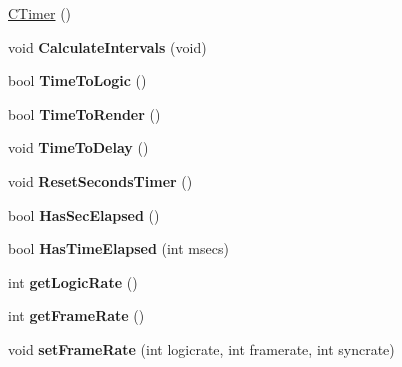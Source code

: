 \begin{DoxyCompactItemize}
\item 
\hyperlink{class_c_timer_a93e4d770fd09f5e1b984768620cc52bf}{CTimer} ()
\item 
\hypertarget{class_c_timer_a060d0fe9aa76f1fbbe64dac348fdf23c}{
void {\bfseries CalculateIntervals} (void)}
\label{class_c_timer_a060d0fe9aa76f1fbbe64dac348fdf23c}

\item 
\hypertarget{class_c_timer_a07cc434c081d25e3338edade3456d5ca}{
bool {\bfseries TimeToLogic} ()}
\label{class_c_timer_a07cc434c081d25e3338edade3456d5ca}

\item 
\hypertarget{class_c_timer_acaf28358697c42d276eb668cc17bafff}{
bool {\bfseries TimeToRender} ()}
\label{class_c_timer_acaf28358697c42d276eb668cc17bafff}

\item 
\hypertarget{class_c_timer_a3450944c4d0c83f0b98abcc0b60c8908}{
void {\bfseries TimeToDelay} ()}
\label{class_c_timer_a3450944c4d0c83f0b98abcc0b60c8908}

\item 
\hypertarget{class_c_timer_a93dc21e68ba0195ee405e5f4cf7c762f}{
void {\bfseries ResetSecondsTimer} ()}
\label{class_c_timer_a93dc21e68ba0195ee405e5f4cf7c762f}

\item 
\hypertarget{class_c_timer_aa7216fa600d38753e85257249d2578cb}{
bool {\bfseries HasSecElapsed} ()}
\label{class_c_timer_aa7216fa600d38753e85257249d2578cb}

\item 
\hypertarget{class_c_timer_a61a79d4f2492329be5d6d17a742b01ad}{
bool {\bfseries HasTimeElapsed} (int msecs)}
\label{class_c_timer_a61a79d4f2492329be5d6d17a742b01ad}

\item 
\hypertarget{class_c_timer_a54c7c0855a24f3cd71182ffb077c5885}{
int {\bfseries getLogicRate} ()}
\label{class_c_timer_a54c7c0855a24f3cd71182ffb077c5885}

\item 
\hypertarget{class_c_timer_aadde0e18f6e4dd3bdf5ebc7d45b6d3ed}{
int {\bfseries getFrameRate} ()}
\label{class_c_timer_aadde0e18f6e4dd3bdf5ebc7d45b6d3ed}

\item 
\hypertarget{class_c_timer_afbb5557712d14fe6aed04e74721932f8}{
void {\bfseries setFrameRate} (int logicrate, int framerate, int syncrate)}
\label{class_c_timer_afbb5557712d14fe6aed04e74721932f8}


\end{DoxyCompactItemize}
